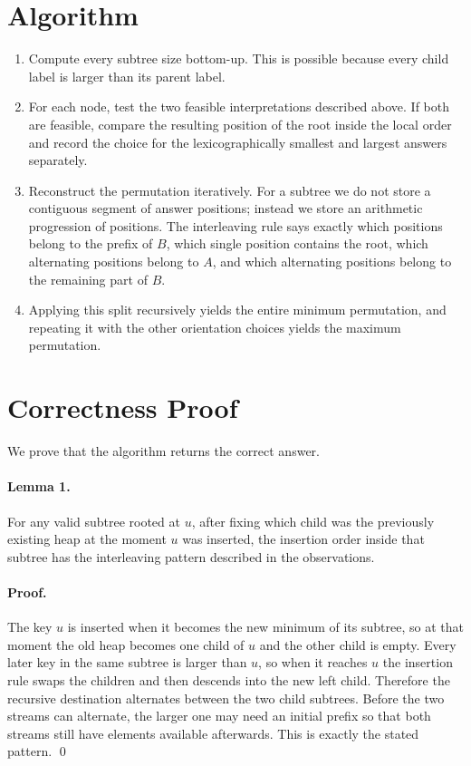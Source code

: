 \documentclass[11pt]{article}
\begin{document}
\section*{Algorithm}

\begin{enumerate}[leftmargin=*]
    \item Compute every subtree size bottom-up. This is possible because every child label is larger than its
    parent label.
    \item For each node, test the two feasible interpretations described above.
    If both are feasible, compare the resulting position of the root inside the local order and record the
    choice for the lexicographically smallest and largest answers separately.
    \item Reconstruct the permutation iteratively.
    For a subtree we do not store a contiguous segment of answer positions; instead we store an arithmetic
    progression of positions.
    The interleaving rule says exactly which positions belong to the prefix of $B$, which single position
    contains the root, which alternating positions belong to $A$, and which alternating positions belong
    to the remaining part of $B$.
    \item Applying this split recursively yields the entire minimum permutation, and repeating it with the
    other orientation choices yields the maximum permutation.
\end{enumerate}

\section*{Correctness Proof}

We prove that the algorithm returns the correct answer.

\paragraph{Lemma 1.}
For any valid subtree rooted at $u$, after fixing which child was the previously existing heap at the
moment $u$ was inserted, the insertion order inside that subtree has the interleaving pattern described in
the observations.

\paragraph{Proof.}
The key $u$ is inserted when it becomes the new minimum of its subtree, so at that moment the old heap
becomes one child of $u$ and the other child is empty. Every later key in the same subtree is larger than
$u$, so when it reaches $u$ the insertion rule swaps the children and then descends into the new left
child. Therefore the recursive destination alternates between the two child subtrees. Before the two
streams can alternate, the larger one may need an initial prefix so that both streams still have elements
available afterwards. This is exactly the stated pattern. \qed
\end{document}
